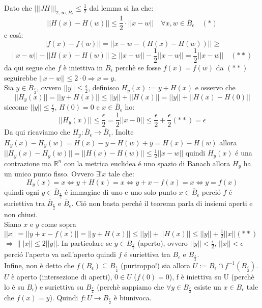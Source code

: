 \documentclass[a4paper,11pt,titlepage]{book}
\begin{document}
Dato che $|||JH|||_{2,\infty,\overline{B}_\epsilon}\leq\frac{1}{2}$ dal lemma si ha che: $$||H(x)-H(w)||\leq\frac{1}{2}\cdot||x-w||\quad \forall x,w\in\overline{B}_\epsilon \quad (*)$$ e così: $$||f(x)-f(w)||=||x-w-(H(x)-H(w))||\geq$$ $$||x-w||-||H(x)-H(w)||\geq||x-w||-\frac{1}{2}||x-w||=\frac{1}{2}||x-w||\quad (**)$$ da qui segue che $f$ è iniettiva in  $\overline{B}_\epsilon$ perchè se fosse $f(x)=f(w)$ da $(**)$ seguirebbe $||x-w||\leq 2\cdot 0\Rightarrow x=y$.\\

Sia $y\in \overline{B}_\frac{\epsilon}{2}$, ovvero $||y||\leq\frac{\epsilon}{2}$, definisco $H_y(x):=y+H(x)$ e osservo che $$||H_y(x)||=||y+H(x)||\leq||y||+||H(x)||=||y||+||H(x)-H(0)||$$ siccome $||y||\leq\frac{\epsilon}{2}$, $H(0)=0$ e $x\in\overline{B}_\epsilon$ ho: $$||H_y(x)||\leq\frac{\epsilon}{2}=\frac{1}{2}||x-0||\leq \frac{\epsilon}{2}+\frac{\epsilon}{2}(**)=\epsilon$$ Da qui ricaviamo che $H_y:\overline{B}_\epsilon\to\overline{B}_\epsilon$. Inolte $H_y(x)-H_y(w)=H(x)-y-H(w)+y=H(x)-H(w)$ allora $||H_y(x)-H_y(w)||=||H(x)-H(w)||\leq\frac{1}{2}||x-w||$ quindi $H_y(x)$ é una contrazione ma $\mathbb{R}^n$ con la metrica euclidea é uno spazio di Banach allora $H_y$ ha un unico punto fisso. Ovvero $\exists!x$ tale che: $$H_y(x)=x\Leftrightarrow y+H(x)=x \Leftrightarrow y+x-f(x)=x\Leftrightarrow y=f(x)$$ quindi ogni $y\in\overline{B}_\frac{\epsilon}{2}$ é immagine di uno e uno solo punto $x\in\overline{B}_\epsilon$ perció $f$ é suriettiva tra $\overline{B}_\frac{\epsilon}{2}$ e $\overline{B}_\epsilon$. Ció non basta perché il teorema parla di insiemi aperti e non chiusi.\\

Siano $x$ e $y$ come sopra $||x||=||y+x-f(x)||=||y+H(x)||\leq||y||+||H(x)||\leq||y||+\frac{1}{2}||x||(**)$ $\Rightarrow\||x||\leq2||y||$. In particolare se $y\in B_\frac{\epsilon}{2}$ (aperto), ovvero $||y||<\frac{\epsilon}{2}$, $||x||<\epsilon$ perció l'aperto va nell'aperto quindi $f$ é suriettiva tra $B_\epsilon$ e $B_\frac{\epsilon}{2}$.\\

Infine, non è detto che $f(B_\epsilon)\subseteq B_{\frac{\epsilon}{2}}$ (purtroppo!) sia allora $U:=B_\epsilon\cap f^{-1}(B_{\frac{\epsilon}{2}})$. $U$ è aperto (intersezione di aperti), $0\in U$ ($f(0)=0$), f è iniettiva su U (perchè lo è su $B_\epsilon$) e suriettiva su $B_{\frac{\epsilon}{2}}$ (perchè sappiamo che $\forall y\in B_{\frac{\epsilon}{2}}$ esiste un $x\in B_\epsilon$ tale che $f(x)=y$). Quindi $f:U\to B_{\frac{\epsilon}{2}}$ è biunivoca.\\
\end{document}
